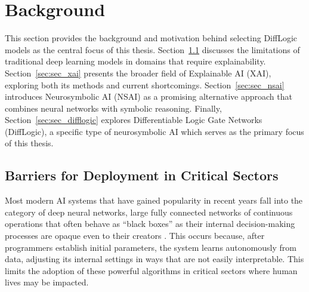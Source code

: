 \chapter{Background}
\label{chap:background}

This section provides the background and motivation behind selecting DiffLogic models as the central focus of this thesis. Section~\ref{sec:sec_criticalsectors} discusses the limitations of traditional deep learning models in domains that require explainability. Section~\ref{sec:sec_xai} presents the broader field of Explainable AI (XAI), exploring both its methods and current shortcomings. Section~\ref{sec:sec_nsai} introduces Neurosymbolic AI (NSAI) as a promising alternative approach that combines neural networks with symbolic reasoning. Finally, Section~\ref{sec:sec_difflogic} explores Differentiable Logic Gate Networks (DiffLogic), a specific type of neurosymbolic AI which serves as the primary focus of this thesis.

\section{Barriers for Deployment in Critical Sectors}
\label{sec:sec_criticalsectors}

Most modern AI systems that have gained popularity in recent years fall into the category of deep neural networks, large fully connected networks of continuous operations that often behave as ``black boxes'' as their internal decision-making processes are opaque even to their creators \cite{black_boxes}. This occurs because, after programmers establish initial parameters, the system learns autonomously from data, adjusting its internal settings in ways that are not easily interpretable. This limits the adoption of these powerful algorithms in critical sectors where human lives may be impacted. 

